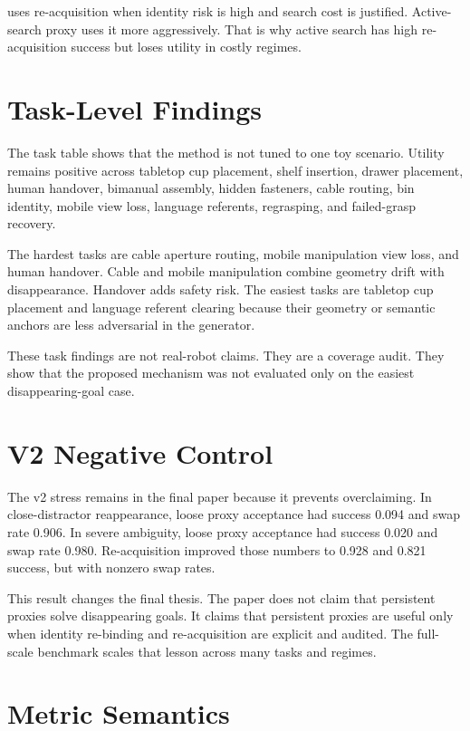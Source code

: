 \method uses re-acquisition when identity risk is high and search cost is justified. Active-search proxy uses it more aggressively. That is why active search has high re-acquisition success but loses utility in costly regimes.

\section{Task-Level Findings}

The task table shows that the method is not tuned to one toy scenario. Utility remains positive across tabletop cup placement, shelf insertion, drawer placement, human handover, bimanual assembly, hidden fasteners, cable routing, bin identity, mobile view loss, language referents, regrasping, and failed-grasp recovery.

The hardest tasks are cable aperture routing, mobile manipulation view loss, and human handover. Cable and mobile manipulation combine geometry drift with disappearance. Handover adds safety risk. The easiest tasks are tabletop cup placement and language referent clearing because their geometry or semantic anchors are less adversarial in the generator.

These task findings are not real-robot claims. They are a coverage audit. They show that the proposed mechanism was not evaluated only on the easiest disappearing-goal case.

\section{V2 Negative Control}

The v2 stress remains in the final paper because it prevents overclaiming. In close-distractor reappearance, loose proxy acceptance had success 0.094 and swap rate 0.906. In severe ambiguity, loose proxy acceptance had success 0.020 and swap rate 0.980. Re-acquisition improved those numbers to 0.928 and 0.821 success, but with nonzero swap rates.

This result changes the final thesis. The paper does not claim that persistent proxies solve disappearing goals. It claims that persistent proxies are useful only when identity re-binding and re-acquisition are explicit and audited. The full-scale benchmark scales that lesson across many tasks and regimes.

\section{Metric Semantics}


